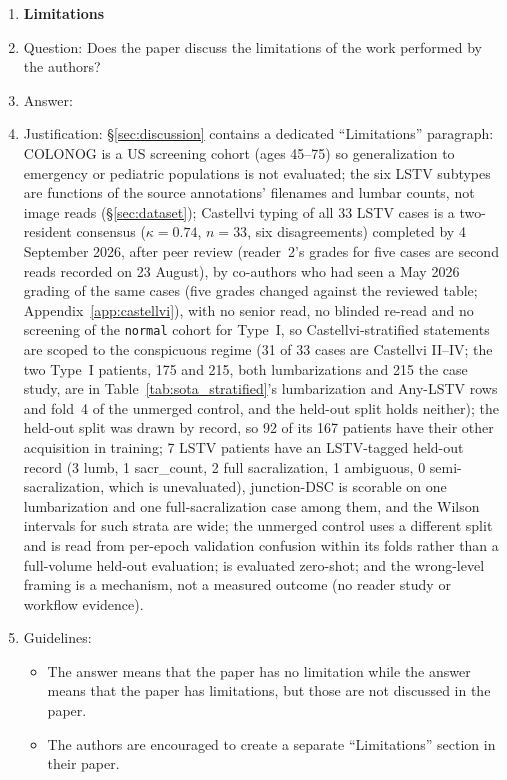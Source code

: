 \begin{enumerate}
\item {\bf Limitations}
    \item[] Question: Does the paper discuss the limitations of the work performed by the authors?
    \item[] Answer: \answerYes{}
    \item[] Justification: \S\ref{sec:discussion} contains a dedicated ``Limitations'' paragraph: COLONOG is a US screening cohort (ages 45--75) so generalization to emergency or pediatric populations is not evaluated; the six LSTV subtypes are functions of the source annotations' filenames and lumbar counts, not image reads (\S\ref{sec:dataset}); Castellvi typing of all 33 LSTV cases is a two-resident consensus ($\kappa{=}0.74$, $n{=}33$, six disagreements) completed by 4 September 2026, after peer review (reader~2's grades for five cases are second reads recorded on 23 August), by co-authors who had seen a May 2026 grading of the same cases (five grades changed against the reviewed table; Appendix~\ref{app:castellvi}), with no senior read, no blinded re-read and no screening of the \texttt{normal} cohort for Type~I, so Castellvi-stratified statements are scoped to the conspicuous regime (31 of 33 cases are Castellvi II--IV; the two Type~I patients, 175 and 215, both lumbarizations and 215 the case study, are in Table~\ref{tab:sota_stratified}'s lumbarization and Any-LSTV rows and fold~4 of the unmerged control, and the held-out split holds neither); the held-out split was drawn by record, so 92 of its 167 patients have their other acquisition in training; 7 LSTV patients have an LSTV-tagged held-out record (3 lumb, 1 sacr\_count, 2 full sacralization, 1 ambiguous, 0 semi-sacralization, which is unevaluated), junction-DSC is scorable on one lumbarization and one full-sacralization case among them, and the Wilson intervals for such strata are wide; the unmerged control uses a different split and is read from per-epoch validation confusion within its folds rather than a full-volume held-out evaluation; \sota{} is evaluated zero-shot; and the wrong-level framing is a mechanism, not a measured outcome (no reader study or workflow evidence).
    \item[] Guidelines:
    \begin{itemize}
        \item The answer \answerNA{} means that the paper has no limitation while the answer \answerNo{} means that the paper has limitations, but those are not discussed in the paper.
        \item The authors are encouraged to create a separate ``Limitations'' section in their paper.

\end{itemize}
\end{enumerate}
